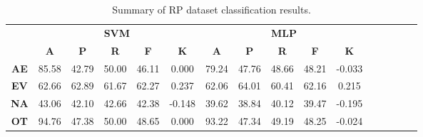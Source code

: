 \begin{landscape}
\begin{table}[htbp]
\footnotesize
\centering
\caption{Summary of RP dataset classification results.}
\label{tab:base_female}
\begin{tabular}{|c|c|c|c|c|c|c|c|c|c|c|c|c|c|c|c|}
\hline
\multirow{2}{*}{}	& \multicolumn{5}{c|}{\textbf{SVM}}												& \multicolumn{5}{c|}{\textbf{MLP}}												\\ \cline{2-11} 
					& \textbf{A}	& \textbf{P}	& \textbf{R}	& \textbf{F}	& \textbf{K}	& \textbf{A}	& \textbf{P}	& \textbf{R}	& \textbf{F}	& \textbf{K}	\\ \hline
\textbf{AE}			& 85.58			& 42.79			& 50.00			& 46.11			& 0.000			& 79.24			& 47.76			& 48.66			& 48.21			& -0.033			\\ \hline
\textbf{EV}			& 62.66			& 62.89			& 61.67			& 62.27			& 0.237			& 62.06			& 64.01			& 60.41			& 62.16			& 0.215			\\ \hline
\textbf{NA}			& 43.06			& 42.10			& 42.66			& 42.38			& -0.148			& 39.62			& 38.84			& 40.12			& 39.47			& -0.195			\\ \hline
\textbf{OT}			& 94.76			& 47.38			& 50.00			& 48.65			& 0.000			& 93.22			& 47.34			& 49.19			& 48.25			& -0.024			\\ \hline
\end{tabular}
\end{table}
\end{landscape}